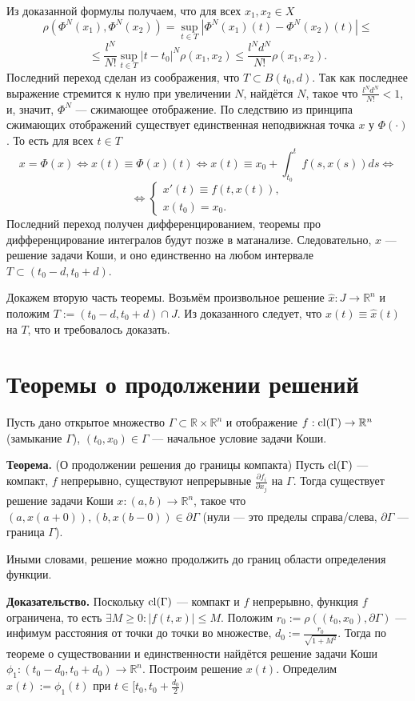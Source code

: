 Из доказанной формулы получаем, что для всех $x_1, x_2 \in X$
\[
    \rho(\Phi^N(x_1), \Phi^N(x_2)) = \sup_{t \in T} \left| \Phi^N(x_1)(t) - \Phi^N(x_2)(t) \right| \le
\]
\[
    \le \frac{l^N}{N!} \sup_{t \in T} |t - t_0|^N \rho(x_1, x_2) \le \frac{l^Nd^N}{N!} \rho(x_1, x_2).
\]
Последний переход сделан из соображения, что $T \subset B(t_0, d)$. Так как последнее выражение стремится к нулю при увеличении $N$, найдётся $N$, такое что $\frac{l^Nd^N}{N!} < 1$, и, значит, $\Phi^N$ --- сжимающее отображение.
По следствию из принципа сжимающих отображений существует единственная неподвижная точка $x$ у $\Phi(\cdot)$.
То есть для всех $t \in T$
\[
    x = \Phi(x) \iff x(t) \equiv \Phi(x)(t) \iff x(t) \equiv x_0 + \int_{t_0}^{t} f(s, x(s))ds \iff
\]
\[
    \iff 
    \begin{cases}
        x'(t) \equiv f(t, x(t)), \\
        x(t_0) = x_0.
    \end{cases}
\]
Последний переход получен дифференцированием, теоремы про дифференцирование интегралов будут позже в матанализе.
Следовательно, $x$ --- решение задачи Коши, и оно единственно на любом интервале $T \subset (t_0 - d, t_0 + d)$.

Докажем вторую часть теоремы. Возьмём произвольное решение $\widehat{x}: J \to \mathbb R^n$ и положим $T := (t_0 - d, t_0 + d) \cap J$.
Из доказанного следует, что $x(t) \equiv \widehat{x}(t)$ на $T$, что и требовалось доказать.

\QED

\section{Теоремы о продолжении решений}
Пусть дано открытое множество $\Gamma \subset \mathbb R \times \mathbb R^n$ и отображение $f: \operatorname{cl}(\Gamma) \to \mathbb R^n$ (замыкание $\Gamma$), $(t_0, x_0) \in \Gamma$ --- начальное условие задачи Коши.

\textbf{Теорема.} (О продолжении решения до границы компакта) 
Пусть $\operatorname{cl}(\Gamma)$ --- компакт, $f$ непрерывно, существуют непрерывные $\frac{\partial f_i}{\partial x_j}$ на $\Gamma$.
Тогда существует решение задачи Коши $x: (a, b) \to \mathbb R^n$, такое что $(a, x(a + 0)), (b, x(b - 0)) \in \partial \Gamma$ (нули --- это пределы справа/слева, $\partial \Gamma$ --- граница $\Gamma$).

Иными словами, решение можно продолжить до границ области определения функции.

\textbf{Доказательство.} Поскольку $\operatorname{cl}(\Gamma)$ --- компакт и $f$ непрерывно, функция $f$ ограничена, то есть $\exists M \ge 0: |f(t, x)| \le M$.
Положим $r_0 := \rho((t_0, x_0), \partial \Gamma)$ --- инфимум расстояния от точки до точки во множестве, $d_0 := \frac{r_0}{\sqrt {1 + M^2}}$.
Тогда по теореме о существовании и единственности найдётся решение задачи Коши $\phi_1: (t_0 - d_0, t_0 + d_0) \to \mathbb R^n$.
Построим решение $x(t)$. Определим $x(t) := \phi_1(t)$ при $t \in [t_0, t_0 + \frac{d_0}{2})$

